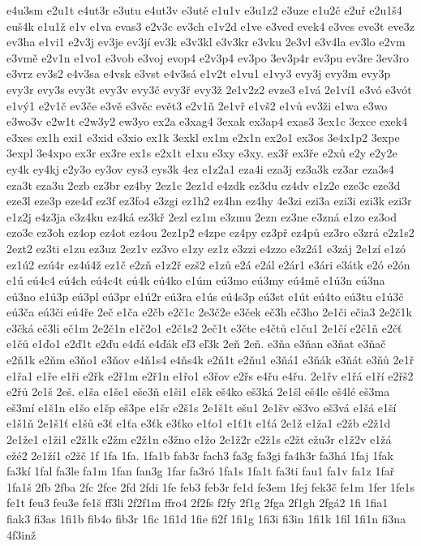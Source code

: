 e4u3sm
e2u1t
e4ut3r
e3utu
e4ut3v
e3utě
e1u1v
e3u1z2
e3uze
e1u2č
e2uř
e2u1š4
euš4k
e1u1ž
e1v
e1va
evas3
e2v3c
ev3ch
e1v2d
e1ve
e3ved
evek4
e3ves
eve3t
eve3z
ev3ha
e1vi1
e2v3j
ev3je
ev3jí
ev3k
e3v3kl
e3v3kr
e3vku
2e3vl
e3v4la
ev3lo
e2vm
e3vmě
e2v1n
e1vo1
e3vob
e3voj
evop4
e2v3p4
ev3po
3ev3p4r
ev3pu
ev3re
3ev3ro
e3vrz
ev3s2
e4v3sa
e4vsk
e3vst
e4v3sá
e1v2t
e1vu1
e1vy3
evy3j
evy3m
evy3p
evy3r
evy3s
evy3t
evy3v
evy3č
evy3ř
evy3ž
2e1v2z2
evze3
e1vá
2e1ví1
e3vó
e3vót
e1vý1
e2v1č
ev3če
e3vě
e3věc
evět3
e2v1ň
2e1vř
e1vš2
e1vů
ev3ži
e1wa
e3wo
e3wo3v
e2w1t
e2w3y2
ew3yo
ex2a
e3xag4
3exak
ex3ap4
exas3
3ex1c
3exce
exek4
e3xes
ex1h
exi1
e3xid
e3xio
ex1k
3exkl
ex1m
e2x1n
ex2o1
ex3os
3e4x1p2
3expe
3expl
3e4xpo
ex3r
ex3re
ex1s
e2x1t
e1xu
e3xy
e3xy.
ex3ř
ex3ře
e2xů
e2y
e2y2e
ey4k
ey4kj
e2y3o
ey3ov
eys3
eys3k
4ez
e1z2a1
eza4i
eza3j
ez3a3k
ez3ar
eza3s4
eza3t
eza3u
2ezb
ez3br
ez4by
2ez1c
2ez1d
e4zdk
ez3du
ez4dv
e1z2e
eze3c
eze3d
eze3l
eze3p
eze4ď
ez3f
ez3fo4
e3zgi
ez1h2
ez4hn
ez4hy
4e3zi
ezi3a
ezi3i
ezi3k
ezi3r
e1z2j
e4z3ja
e3z4ku
ez4ká
ez3kř
2ezl
ez1m
e3zmu
2ezn
ez3ne
e3zná
e1zo
ez3od
ezo3e
ez3oh
ez4op
ez4ot
ez4ou
2ez1p2
e4zpe
ez4py
ez3př
ez4pů
ez3ro
e3zrá
e2z1s2
2ezt2
ez3ti
e1zu
ez3uz
2ez1v
ez3vo
e1zy
ez1z
e3zzi
e4zzo
e3z2á1
e3záj
2e1zí
e1zó
ez1ú2
ezú4r
ez4ú4ž
ez1č
e2zň
e1z2ř
ezš2
e1zů
e2á
e2ál
e2ár1
e3ári
e3átk
e2ó
e2ón
e1ú
eú4c4
eú4ch
eú4c4t
eú4k
eú4ko
e1úm
eú3mo
eú3my
eú4mě
e1ú3n
eú3na
eú3no
e1ú3p
eú3pl
eú3pr
e1ú2r
eú3ra
e1ús
eú4s3p
eú3st
e1út
eú4to
eú3tu
e1ú3č
eú3ča
eú3či
eú4ře
2eč
e1ča
e2čb
e2č1c
2e3č2e
e3ček
eč3h
eč3ho
2e1či
ečia3
2e2č1k
e3čká
eč3li
eč1m
2e2č1n
e1č2o1
e2č1s2
2eč1t
e3čte
e4čtů
e1ču1
2e1čí
e2č1ň
e2čť
e1čů
e1ďo1
e2ď1t
e2ďu
e4ďá
e4ďák
eľ3
eľ3k
2eň
2eň.
e3ňa
e3ňan
e3ňat
e3ňač
e2ň1k
e2ňm
e3ňo1
e3ňov
e4ň1s4
e4ňs4k
e2ň1t
e2ňu1
e3ňá1
e3ňák
e3ňát
e3ňů
2e1ř
e1řa1
e1ře
e1ři
e2řk
e2ř1m
e2ř1n
e1řo1
e3řov
e2řs
e4řu
e4řu.
2e1řv
e1řá
e1ří
e2řš2
e2řů
2e1š
2eš.
e1ša
e1še1
eše3ň
e1ši1
e1šk
eš4ko
eš3ká
2e1šl
eš4le
eš4lé
eš3ma
eš3mí
e1š1n
e1šo
e1šp
eš3pe
e1šr
e2š1s
2e1š1t
ešu1
2e1šv
eš3vo
eš3vá
e1šá
e1ší
e1š1ň
2e1š1ť
e1šů
e3ť
e1ťa
e3ťk
e3ťko
e1ťo1
e1ť1t
e1ťá
2e1ž
e1ža1
e2žb
e2ž1d
2e1že1
e1ži1
e2ž1k
e2žm
e2ž1n
e3žno
e1žo
2e1ž2r
e2ž1s
e2žt
ežu3r
e1ž2v
e1žá
ežé2
2e1ží1
e2žč
1f
1fa
1fa.
1fa1b
fab3r
fach3
fa3g
fa3gi
fa4h3r
fa3há
1faj
1fak
fa3kí
1fal
fa3le
fa1m
1fan
fan3g
1far
fa3ró
1fa1s
1fa1t
fa3ti
fau1
fa1v
fa1z
1fař
1fa1š
2fb
2fba
2fc
2fce
2fd
2fdi
1fe
feb3
feb3r
fe1d
fe3em
1fej
fek3č
fe1m
1fer
1fe1s
fe1t
feu3
feu3e
fe1š
ff3li
2f2f1m
ffro4
2f2fs
f2fy
2f1g
2fga
2f1gh
2fgá2
1fi
1fia1
fiak3
fi3as
1fi1b
fib4o
fib3r
1fic
1fi1d
1fie
fi2f
1fi1g
1fi3i
fi3in
1fi1k
1fil
1fi1n
fi3na
4f3inž
